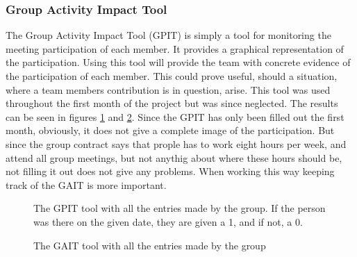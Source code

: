\subsubsection{Group Activity Impact Tool}
The Group Activity Impact Tool (GPIT) is simply a tool for monitoring the meeting participation of each member. It provides a graphical representation of the participation. Using this tool will provide the team with concrete evidence of the participation of each member. This could prove useful, should a situation, where a team members contribution is in question, arise. This tool was used throughout the first month of the project but was since neglected. The results can be seen in figures \ref{fig:GPIT} and \ref{fig:GPITGraph}. Since the GPIT has only been filled out the first month, obviously, it does not give a complete image of the participation. But since the group contract says that prople has to work eight hours per week, and attend all group meetings, but not anythig about where these hours should be, not filling it out does not give any problems. When working this way keeping track of the GAIT is more important. 

\begin{figure}[h!]

	\caption{The GPIT tool with all the entries made by the group. If the person was there on the given date, they are given a 1, and if not, a 0. }
		\label{fig:GPIT}
\end{figure}

\begin{figure}[h!]

	\caption{The GAIT tool with all the entries made by the group}
	\label{fig:GPITGraph}	
 \end{figure}


